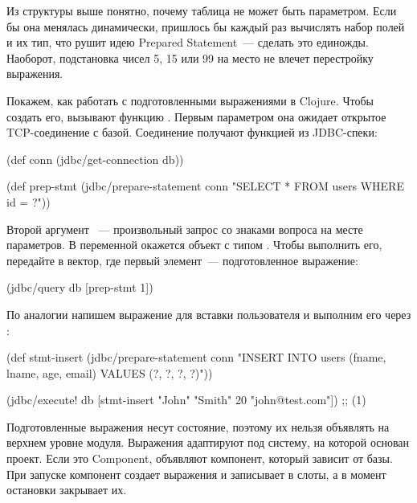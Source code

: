 Из структуры выше понятно, почему таблица не может быть параметром. Если бы она менялась динамически, пришлось бы каждый раз вычислять набор полей и их тип, что рушит идею Prepared Statement~--- сделать это единожды. Наоборот, подстановка чисел 5, 15 или 99 на место  не влечет перестройку выражения.

Покажем, как работать с подготовленными выражениями в Clojure. Чтобы создать его, вызывают функцию . Первым параметром она ожидает открытое TCP-соединение с базой. Соединение получают функцией  из JDBC-спеки:

\begin{english}
  \begin{clojure}
(def conn
  (jdbc/get-connection db))

(def prep-stmt
  (jdbc/prepare-statement conn
    "SELECT * FROM users WHERE id = ?"))
  \end{clojure}
\end{english}

Второй аргумент ~--- произвольный запрос со знаками вопроса на месте параметров. В переменной  окажется объект с типом . Чтобы выполнить его, передайте в  вектор, где первый элемент~--- подготовленное выражение:

\begin{english}
  \begin{clojure}
(jdbc/query db [prep-stmt 1])
  \end{clojure}
\end{english}

По аналогии напишем выражение для вставки пользователя и выполним его через :

\begin{english}
  \begin{clojure}
(def stmt-insert
  (jdbc/prepare-statement conn
    "INSERT INTO users (fname, lname, age, email)
     VALUES (?, ?, ?, ?)"))

(jdbc/execute! db
  [stmt-insert "John" "Smith" 20 "john@test.com"])
;; (1)
  \end{clojure}
\end{english}

Подготовленные выражения несут состояние, поэтому их нельзя объявлять на верхнем уровне модуля. Выражения адаптируют под систему, на которой основан проект. Если это Component, объявляют компонент, который зависит от базы. При запуске компонент создает выражения и записывает в слоты, а в момент остановки закрывает их.

